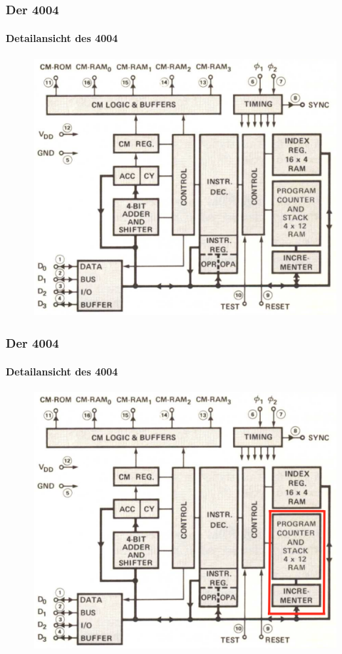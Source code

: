 \begin{frame}
	\frametitle{Der 4004}
	\framesubtitle{Detailansicht des 4004}
			\begin{figure}[ht]
				\includegraphics[width=0.7\linewidth]{images/layout_4004.png}
			\end{figure}
\end{frame}

\begin{frame}
	\frametitle{Der 4004}
	\framesubtitle{Detailansicht des 4004}
	\begin{figure}[ht]
		\includegraphics[width=0.7\linewidth]{images/layout_4004_1.png}
	\end{figure}
\end{frame}

